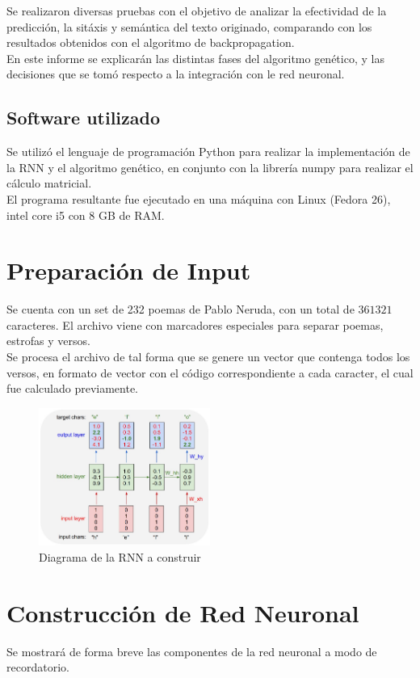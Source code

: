 \documentclass[11pt,letterpaper]{article}
\begin{document}
Se realizaron diversas pruebas con el objetivo de analizar la efectividad 
de la predicción, la sitáxis y semántica del texto originado, comparando 
con los resultados obtenidos con el algoritmo de backpropagation.\\

En este informe se explicarán las distintas fases del algoritmo genético, 
y las decisiones que se tomó respecto a la integración con le red neuronal.

\subsection{Software utilizado}
Se utilizó el lenguaje de programación Python para realizar la implementación de
la RNN y el algoritmo genético, en conjunto con la librería numpy para realizar el 
cálculo matricial.\\

El programa resultante fue ejecutado en una máquina con Linux (Fedora 26),
intel core i5 con 8 GB de RAM.
\clearpage
\section{Preparación de Input}
Se cuenta con un set de 232 poemas de Pablo Neruda, con un total de $361321$ caracteres. 
El archivo viene con marcadores especiales para separar poemas, estrofas y versos.\\

Se procesa el archivo de tal forma que se genere un vector que contenga todos los versos, 
en formato de vector con el código correspondiente a cada caracter, el cual fue calculado 
previamente.

\begin{figure}[ht!]
\centering \includegraphics[width=0.5\textwidth]{img/charseq.jpeg}
\caption{Diagrama de la RNN a construir} \label{img1}
\end{figure}

\section{Construcción de Red Neuronal}
Se mostrará de forma breve las componentes de la red neuronal a modo de recordatorio.
\end{document}
